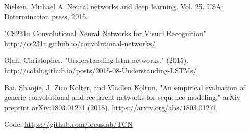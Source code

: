 \documentclass[12pt, titlepage]{article}
\begin{document}
\begin{thebibliography}{0}
   Nielsen, Michael A. Neural networks and deep learning. Vol. 25. USA: Determination press, 2015.
  
   "CS231n Convolutional Neural Networks for Visual Recognition" \url{http://cs231n.github.io/convolutional-networks/}
  
   Olah, Christopher. "Understanding lstm networks." (2015). \url{http://colah.github.io/posts/2015-08-Understanding-LSTMs/}
  
   Bai, Shaojie, J. Zico Kolter, and Vladlen Koltun. "An empirical evaluation of generic convolutional and recurrent networks for sequence modeling." arXiv preprint arXiv:1803.01271 (2018). \url{https://arxiv.org/abs/1803.01271} 
  
  Code: \url{https://github.com/locuslab/TCN}
  
  


  
  
  
  
  \end{thebibliography}


 
\end{document}
